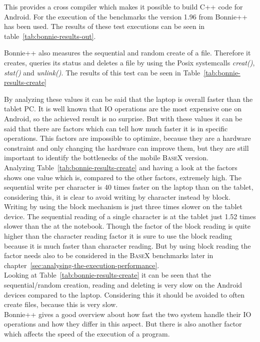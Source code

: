 This provides a cross compiler which makes it possible to build C++ code for Android.
For the execution of the benchmarks the version 1.96 from Bonnie++ has been used.
The results of these test executions can be seen in table~\ref{tab:bonnie-results-out}.

Bonnie++ also measures the sequential and random create of a file.
Therefore it creates, queries its status and deletes a file by using the Posix systemcalls \textit{creat()}, \textit{stat()} and \textit{unlink()}.
The results of this test can be seen in Table~\ref{tab:bonnie-results-create}

By analyzing these values it can be said that the laptop is overall faster than the tablet PC.
It is well known that IO operations are the most expensive one on Android, so the achieved result is no surprise. 
But with these values it can be said that there are factors which can tell how much faster it is in specific operations.
This factors are impossible to optimize, because they are a hardware constraint and only changing the hardware can improve them, but they are still important to identify the bottlenecks of the mobile \textsc{BaseX} version.\\
Analyzing Table~\ref{tab:bonnie-results-create} and having a look at the factors shows one value which is, compared to the other factors, extremely high.
The sequential write per character is 40 times faster on the laptop than on the tablet, considering this, it is clear to avoid writing by character instead by block.
Writing by using the block mechanism is just three times slower on the tablet device.
The sequential reading of a single character is at the tablet just 1.52 times slower than the at the notebook.
Though the factor of the block reading is quite higher than the character reading factor it is sure to use the block reading because it is much faster than character reading.
But by using block reading the factor needs also to be considered in the \textsc{BaseX} benchmarks later in chapter~\ref{sec:analysing-the-execution-performance}.
\\
Looking at Table~\ref{tab:bonnie-results-create} it can be seen that the sequential/random creation, reading and deleting is very slow on the Android devices compared to the laptop.
Considering this it should be avoided to often create files, because this is very slow.\\
Bonnie++ gives a good overview about how fast the two system handle their IO operations and how they differ in this aspect.
But there is also another factor which affects the speed of the execution of a program.
